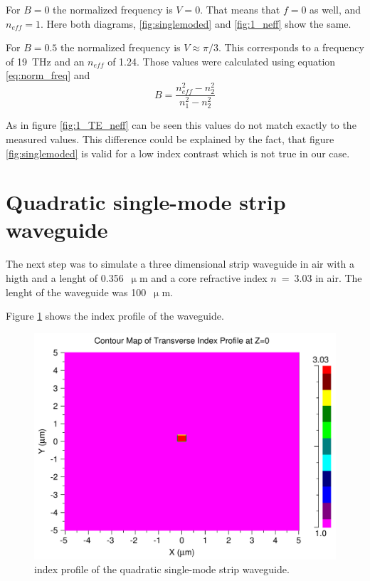 For $B = 0$ the normalized frequency is $V = 0$. That means that $f = 0$ as well, and $n_{eff}= 1$. Here both diagrams, \ref{fig:singlemoded} and \ref{fig:1_neff} show the same.

For $B = 0.5$ the normalized frequency is $V\approx\pi/3$.
This corresponds to a frequency of 19~THz and an $n_{eff}$ of 1.24. 
Those values were calculated using equation \eqref{eq:norm_freq} and 
\begin{equation}
B = \frac{n_{eff}^2 - n_2^2}{n_1^2-n_2^2}
\label{eq:}
\end{equation}

As in figure \ref{fig:1_TE_neff} can be seen this values do not match exactly to the measured values.
This difference could be explained by the fact, that figure \ref{fig:singlemoded} is valid for a low index contrast which is not true in our case.

\section{Quadratic single-mode strip waveguide}
\label{sec:task2}

The next step was to simulate a three dimensional strip waveguide in air with a higth and a lenght of 0.356~$\upmu$m and a core refractive index $n$~=~3.03 in air.
The lenght of the waveguide was 100~$\upmu$m.

Figure \ref{fig:2_index} shows the index profile of the waveguide.
% 

\begin{figure}[h]%
\centering
\includegraphics[totalheight=5.5 cm]{Grafiken/2_index.pdf}%
\caption{index profile of the quadratic single-mode strip waveguide.}%
\label{fig:2_index}%
\end{figure}

